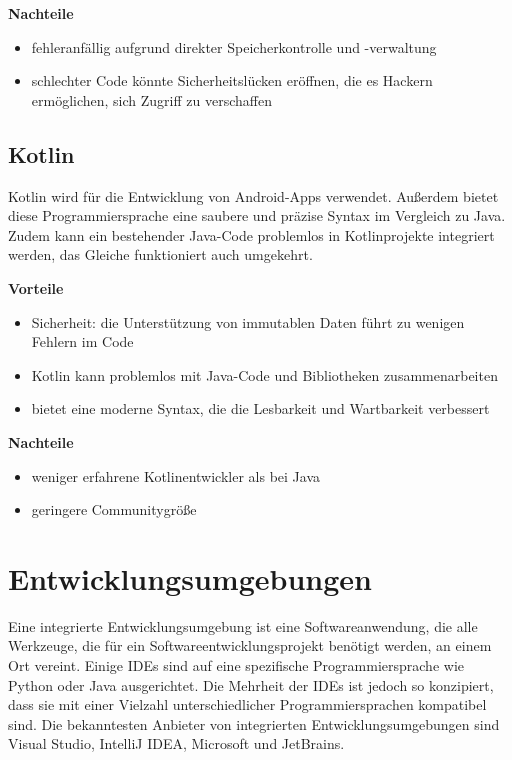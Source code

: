 \textbf{Nachteile}
\begin{itemize}
	\item fehleranfällig aufgrund direkter Speicherkontrolle und -verwaltung
	\item schlechter Code könnte Sicherheitslücken eröffnen, die es Hackern ermöglichen, sich Zugriff zu verschaffen
\end{itemize}



\subsection{Kotlin}
Kotlin wird für die Entwicklung von Android-Apps verwendet. Außerdem bietet diese Programmiersprache eine saubere und präzise Syntax im Vergleich zu Java. Zudem kann ein bestehender Java-Code problemlos in Kotlinprojekte integriert werden, das Gleiche funktioniert auch umgekehrt. \parencite{Kotlin}

\textbf{Vorteile}
\begin{itemize}
	\item Sicherheit: die Unterstützung von immutablen Daten führt zu wenigen Fehlern im Code
	\item Kotlin kann problemlos mit Java-Code und Bibliotheken zusammenarbeiten
	\item bietet eine moderne Syntax, die die Lesbarkeit und Wartbarkeit verbessert
\end{itemize}

\textbf{Nachteile}
\begin{itemize}
	\item weniger erfahrene Kotlinentwickler als bei Java
	\item geringere Communitygröße
\end{itemize}


\section{Entwicklungsumgebungen}
Eine integrierte Entwicklungsumgebung ist eine Softwareanwendung, die alle Werkzeuge, die für ein Softwareentwicklungsprojekt benötigt werden, an einem Ort vereint. Einige IDEs sind auf eine spezifische Programmiersprache wie Python oder Java ausgerichtet. Die Mehrheit der IDEs ist jedoch so konzipiert, dass sie mit einer Vielzahl unterschiedlicher Programmiersprachen kompatibel sind. Die bekanntesten Anbieter von integrierten Entwicklungsumgebungen sind Visual Studio, IntelliJ IDEA, Microsoft und JetBrains. 

